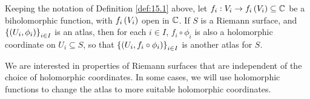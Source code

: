 \begin{remark}
Keeping the notation of Definition \ref{def:15.1} above, let $ f_i : V_i \to f_i\left( V_i \right) \subseteq \mathbb{C} $ be a biholomorphic function, with $ f_i\left( V_i \right) $ open in $ \mathbb{C} $. If $ S $ is a Riemann surface, and $ \left\{ \left( U_i, \phi_i \right) \right\}_{i \in I} $ is an atlas, then for each $ i \in I $, $ f_i \circ \phi_i $ is also a holomorphic coordinate on $ U_i \subseteq S $, so that $ \left\{ \left( U_i, f_i \circ \phi_i \right) \right\}_{i \in I} $ is another atlas for $ S $.
\end{remark}

\pagebreak

We are interested in properties of Riemann surfaces that are independent of the choice of holomorphic coordinates. In some cases, we will use holomorphic functions to change the atlas to more suitable holomorphic coordinates.

